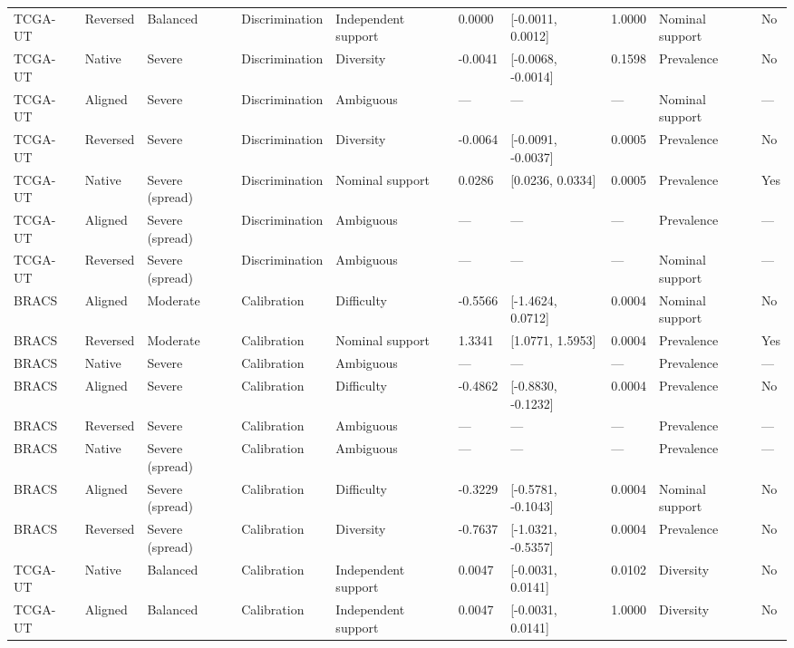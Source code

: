 \begin{longtable}{llllllllll}
TCGA-UT & Reversed & Balanced & Discrimination & Independent support & 0.0000 & [-0.0011, 0.0012] & 1.0000 & Nominal support & No \\
TCGA-UT & Native & Severe & Discrimination & Diversity & -0.0041 & [-0.0068, -0.0014] & 0.1598 & Prevalence & No \\
TCGA-UT & Aligned & Severe & Discrimination & Ambiguous & --- & --- & --- & Nominal support & --- \\
TCGA-UT & Reversed & Severe & Discrimination & Diversity & -0.0064 & [-0.0091, -0.0037] & 0.0005 & Prevalence & No \\
TCGA-UT & Native & Severe (spread) & Discrimination & Nominal support & 0.0286 & [0.0236, 0.0334] & 0.0005 & Prevalence & Yes \\
TCGA-UT & Aligned & Severe (spread) & Discrimination & Ambiguous & --- & --- & --- & Prevalence & --- \\
TCGA-UT & Reversed & Severe (spread) & Discrimination & Ambiguous & --- & --- & --- & Nominal support & --- \\
BRACS & Aligned & Moderate & Calibration & Difficulty & -0.5566 & [-1.4624, 0.0712] & 0.0004 & Nominal support & No \\
BRACS & Reversed & Moderate & Calibration & Nominal support & 1.3341 & [1.0771, 1.5953] & 0.0004 & Prevalence & Yes \\
BRACS & Native & Severe & Calibration & Ambiguous & --- & --- & --- & Prevalence & --- \\
BRACS & Aligned & Severe & Calibration & Difficulty & -0.4862 & [-0.8830, -0.1232] & 0.0004 & Prevalence & No \\
BRACS & Reversed & Severe & Calibration & Ambiguous & --- & --- & --- & Prevalence & --- \\
BRACS & Native & Severe (spread) & Calibration & Ambiguous & --- & --- & --- & Prevalence & --- \\
BRACS & Aligned & Severe (spread) & Calibration & Difficulty & -0.3229 & [-0.5781, -0.1043] & 0.0004 & Nominal support & No \\
BRACS & Reversed & Severe (spread) & Calibration & Diversity & -0.7637 & [-1.0321, -0.5357] & 0.0004 & Prevalence & No \\
TCGA-UT & Native & Balanced & Calibration & Independent support & 0.0047 & [-0.0031, 0.0141] & 0.0102 & Diversity & No \\
TCGA-UT & Aligned & Balanced & Calibration & Independent support & 0.0047 & [-0.0031, 0.0141] & 1.0000 & Diversity & No \\

\end{longtable}
